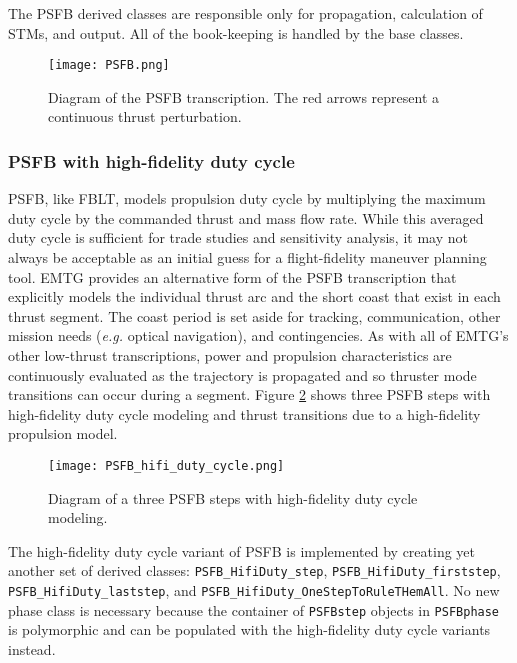 The \ac{PSFB} derived classes are responsible only for propagation, calculation of \ac{STM}s, and output. All of the book-keeping is handled by the base classes.

\begin{figure}
	\centering
	\texttt{[image: PSFB.png]}
	\caption{\label{fig:PSFB} Diagram of the \ac{PSFB} transcription. The red arrows represent a continuous thrust perturbation.}
\end{figure}

\FloatBarrier

\subsubsection{PSFB with high-fidelity duty cycle}
\label{subsubsec:PSFB_with_high_fidelity_duty_cycle}

\ac{PSFB}, like \ac{FBLT}, models propulsion duty cycle by multiplying the maximum duty cycle by the commanded thrust and mass flow rate. While this averaged duty cycle is sufficient for trade studies and sensitivity analysis, it may not always be acceptable as an initial guess for a flight-fidelity maneuver planning tool. \ac{EMTG} provides an alternative form of the \ac{PSFB} transcription that explicitly models the individual thrust arc and the short coast that exist in each thrust segment. The coast period is set aside for tracking, communication, other mission needs (\textit{e.g.} optical navigation), and contingencies. As with all of \ac{EMTG}'s other low-thrust transcriptions, power and propulsion characteristics are continuously evaluated as the trajectory is propagated and so thruster mode transitions can occur during a segment. Figure \ref{fig:PSFB_hifi_duty} shows three \ac{PSFB} steps with high-fidelity duty cycle modeling and thrust transitions due to a high-fidelity propulsion model.

\begin{figure}
	\centering
	\texttt{[image: PSFB\_hifi\_duty\_cycle.png]}
	\caption{\label{fig:PSFB_hifi_duty} Diagram of a three \ac{PSFB} steps with high-fidelity duty cycle modeling.}
\end{figure}

The high-fidelity duty cycle variant of \ac{PSFB} is implemented by creating yet another set of derived classes: \texttt{PSFB\_HifiDuty\_step}, \texttt{PSFB\_HifiDuty\_firststep}, \texttt{PSFB\_HifiDuty\_laststep}, and \texttt{PSFB\_HifiDuty\_OneStepToRuleTHemAll}. No new phase class is necessary because the container of \texttt{PSFBstep} objects in \texttt{PSFBphase} is polymorphic and can be populated with the high-fidelity duty cycle variants instead.

